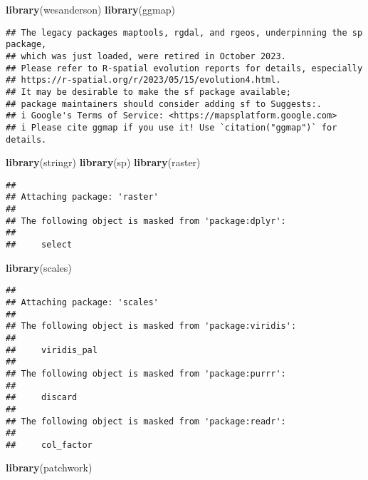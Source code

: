 \documentclass[
]{article}
\newenvironment{Shaded}{\begin{snugshade}}{\end{snugshade}}
\newcommand{\FunctionTok}[1]{\textcolor[rgb]{0.13,0.29,0.53}{\textbf{#1}}}
\newcommand{\NormalTok}[1]{#1}
\begin{document}
\begin{Shaded}
\begin{Highlighting}[]
\FunctionTok{library}\NormalTok{(wesanderson)}
\FunctionTok{library}\NormalTok{(ggmap)}
\end{Highlighting}
\end{Shaded}

\begin{verbatim}
## The legacy packages maptools, rgdal, and rgeos, underpinning the sp package,
## which was just loaded, were retired in October 2023.
## Please refer to R-spatial evolution reports for details, especially
## https://r-spatial.org/r/2023/05/15/evolution4.html.
## It may be desirable to make the sf package available;
## package maintainers should consider adding sf to Suggests:.
## i Google's Terms of Service: <https://mapsplatform.google.com>
## i Please cite ggmap if you use it! Use `citation("ggmap")` for details.
\end{verbatim}

\begin{Shaded}
\begin{Highlighting}[]
\FunctionTok{library}\NormalTok{(stringr)}
\FunctionTok{library}\NormalTok{(sp)}
\FunctionTok{library}\NormalTok{(raster)}
\end{Highlighting}
\end{Shaded}

\begin{verbatim}
## 
## Attaching package: 'raster'
## 
## The following object is masked from 'package:dplyr':
## 
##     select
\end{verbatim}

\begin{Shaded}
\begin{Highlighting}[]
\FunctionTok{library}\NormalTok{(scales)}
\end{Highlighting}
\end{Shaded}

\begin{verbatim}
## 
## Attaching package: 'scales'
## 
## The following object is masked from 'package:viridis':
## 
##     viridis_pal
## 
## The following object is masked from 'package:purrr':
## 
##     discard
## 
## The following object is masked from 'package:readr':
## 
##     col_factor
\end{verbatim}

\begin{Shaded}
\begin{Highlighting}[]
\FunctionTok{library}\NormalTok{(patchwork)}
\end{Highlighting}
\end{Shaded}
\end{document}
